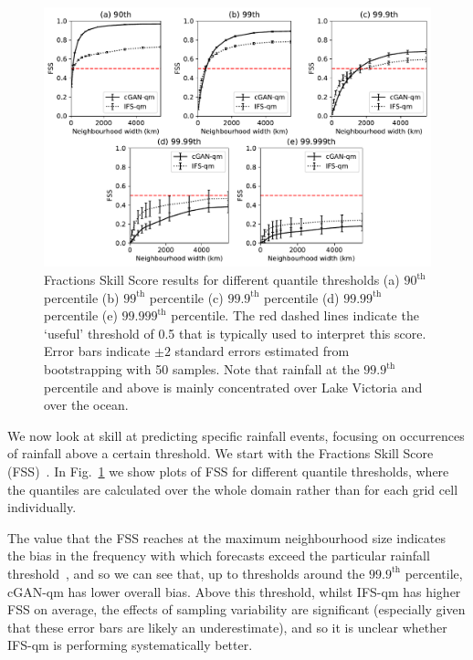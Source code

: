 \documentclass{article}
\begin{document}
\begin{figure}[t]
    \centering\includegraphics[width=\textwidth]{images/fss_final-nologs_217600.pdf}
     \caption{Fractions Skill Score results for different quantile thresholds (a) $90^{\text{th}}$ percentile (b) $99^{\text{th}}$ percentile (c) $99.9^{\text{th}}$ percentile (d) $99.99^{\text{th}}$ percentile (e) $99.999^{\text{th}}$ percentile. The red dashed lines indicate the `useful' threshold of 0.5 that is typically used to interpret this score. Error bars indicate $\pm2$ standard errors estimated from bootstrapping with 50 samples. Note that rainfall at the $99.9^{\text{th}}$ percentile and above is mainly concentrated over Lake Victoria and over the ocean. }
     \label{fig:fss}
\end{figure}

We now look at skill at predicting specific rainfall events, focusing on occurrences of rainfall above a certain threshold. We start with the Fractions Skill Score (FSS)~\citep{roberts_assessing_2008, roberts_scale-selective_2008, mittermaier_meta_2021}. In Fig.~\ref{fig:fss} we show plots of FSS for different quantile thresholds, where the quantiles are calculated over the whole domain rather than for each grid cell individually.

The value that the FSS reaches at the maximum neighbourhood size indicates the bias in the frequency with which forecasts exceed the particular rainfall threshold~\citep{roberts_assessing_2008, roberts_scale-selective_2008}, and so we can see that, up to thresholds around the $99.9^{\text{th}}$ percentile, cGAN-qm has lower overall bias. Above this threshold, whilst IFS-qm has higher FSS on average, the effects of sampling variability are significant (especially given that these error bars are likely an underestimate), and so it is unclear whether IFS-qm is performing systematically better. 
\end{document}
